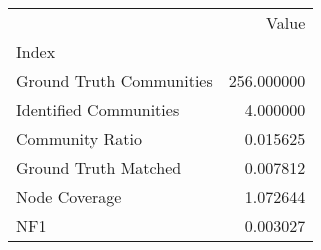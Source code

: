 \begin{tabular}{lr}
\toprule
{} &       Value \\
Index                    &             \\
\midrule
Ground Truth Communities &  256.000000 \\
Identified Communities   &    4.000000 \\
Community Ratio          &    0.015625 \\
Ground Truth Matched     &    0.007812 \\
Node Coverage            &    1.072644 \\
NF1                      &    0.003027 \\
\bottomrule
\end{tabular}
